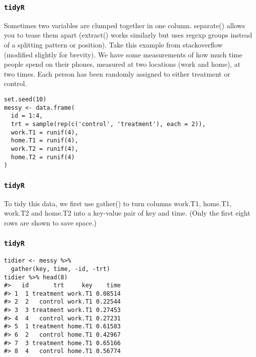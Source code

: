 \begin{frame}[fragile]
\frametitle{\texttt{tidyR} }
Sometimes two variables are clumped together in one column. separate() allows you to tease them apart (extract() works similarly but uses regexp groups instead of a splitting pattern or position). Take this example from stackoverflow (modified slightly for brevity). We have some measurements of how much time people spend on their phones, measured at two locations (work and home), at two times. Each person has been randomly assigned to either treatment or control.
\begin{framed}
	\begin{verbatim}
set.seed(10)
messy <- data.frame(
  id = 1:4,
  trt = sample(rep(c('control', 'treatment'), each = 2)),
  work.T1 = runif(4),
  home.T1 = runif(4),
  work.T2 = runif(4),
  home.T2 = runif(4)
)

\end{verbatim}
\end{framed}
\end{frame}
\begin{frame}[fragile]
\frametitle{\texttt{tidyR} }
To tidy this data, we first use gather() to turn columns work.T1, home.T1, work.T2 and home.T2 into a key-value pair of key and time. (Only the first eight rows are shown to save space.)

\end{frame}
\begin{frame}[fragile]
\frametitle{\texttt{tidyR} }
\begin{framed}
	\begin{verbatim}
tidier <- messy %>%
  gather(key, time, -id, -trt)
tidier %>% head(8)
#>   id       trt     key    time
#> 1  1 treatment work.T1 0.08514
#> 2  2   control work.T1 0.22544
#> 3  3 treatment work.T1 0.27453
#> 4  4   control work.T1 0.27231
#> 5  1 treatment home.T1 0.61583
#> 6  2   control home.T1 0.42967
#> 7  3 treatment home.T1 0.65166
#> 8  4   control home.T1 0.56774
\end{verbatim}
\end{framed}
\end{frame}
